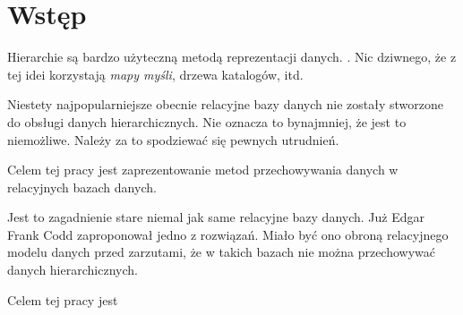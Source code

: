 \chapter*{Wstęp}




Hierarchie są bardzo użyteczną metodą reprezentacji danych. . 
Nic dziwnego, że z tej idei korzystają \emph{mapy myśli}, drzewa katalogów, itd.

Niestety najpopularniejsze obecnie relacyjne bazy danych nie zostały stworzone do obsługi danych hierarchicznych.
Nie oznacza to bynajmniej, że jest to niemożliwe.
Należy za to spodziewać się pewnych utrudnień.

Celem tej pracy jest zaprezentowanie metod przechowywania danych w relacyjnych bazach danych. 

Jest to zagadnienie stare niemal jak same relacyjne bazy danych. Już Edgar Frank Codd zaproponował jedno z rozwiązań.
Miało być ono obroną relacyjnego modelu danych przed zarzutami, że w takich bazach nie można przechowywać danych hierarchicznych.



Celem tej pracy jest 






